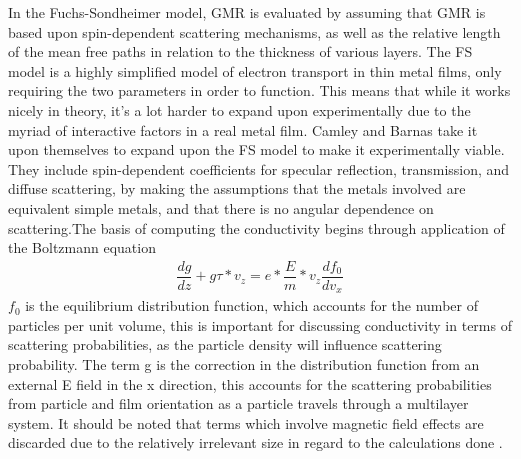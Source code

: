 \documentclass[11pt]{article}
\begin{document}
\begin{multicols}{2}
In the Fuchs-Sondheimer model, GMR is evaluated by assuming that GMR is based upon spin-dependent scattering mechanisms, as well as the relative length of the mean free paths in relation to the thickness of various layers. The FS model is a highly simplified model of electron transport in thin metal films, only requiring the two parameters in order to function. This means that while it works nicely in theory, it’s a lot harder to expand upon experimentally due to the myriad of interactive factors in a real metal film. Camley and Barnas take it upon themselves to expand upon the FS model to make it experimentally viable. They include spin-dependent coefficients for specular reflection, transmission, and diffuse scattering, by making the assumptions that the metals involved are equivalent simple metals, and that there is no angular dependence on scattering.The basis of computing the conductivity begins through application of the Boltzmann equation
\begin{align*}
\dfrac{dg}{dz}+ g τ*v_z = e*\dfrac{E}{m}*v_z \dfrac{df_0}{dv_x}
\end{align*}
$f_0$ is the equilibrium distribution function, which accounts for the number of particles per unit volume, this is important for discussing conductivity in terms of scattering probabilities, as the particle density will influence scattering probability. The term g is the correction in the distribution function from an external E field in the x direction, this accounts for the scattering probabilities from particle and film orientation as a particle travels through a multilayer system. It should be noted that terms which involve magnetic field effects are discarded due to the relatively irrelevant size in regard to the calculations done \cite{label2}. 


\end{multicols}
\end{document}
